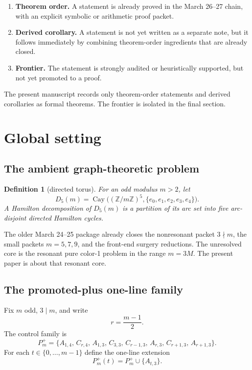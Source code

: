 \documentclass[11pt]{article}
\newtheorem{definition}[theorem]{Definition}
\newcommand{\Z}{\mathbb Z}
\newcommand{\1}{\mathbf 1}
\begin{document}
\begin{enumerate}[label=\textup{(\roman*)},leftmargin=2.8em]
\item \textbf{Theorem order.} A statement is already proved in the March 26--27 chain, with an explicit symbolic or arithmetic proof packet.
\item \textbf{Derived corollary.} A statement is not yet written as a separate note, but it follows immediately by combining theorem-order ingredients that are already closed.
\item \textbf{Frontier.} The statement is strongly audited or heuristically supported, but not yet promoted to a proof.
\end{enumerate}

The present manuscript records only theorem-order statements and derived corollaries as formal theorems.
The frontier is isolated in the final section.

\section{Global setting}

\subsection{The ambient graph-theoretic problem}

\begin{definition}[directed torus]
For an odd modulus \(m>2\), let
\[
D_5(m)=\operatorname{Cay}\big((\Z/m\Z)^5,\{e_0,e_1,e_2,e_3,e_4\}\big).
\]
A Hamilton decomposition of \(D_5(m)\) is a partition of its arc set into five arc-disjoint directed Hamilton cycles.
\end{definition}

The older March 24--25 package already closes the nonresonant packet \(3\nmid m\), the small packets \(m=5,7,9\), and the front-end surgery reductions.
The unresolved core is the resonant pure color-1 problem in the range \(m=3M\).
The present paper is about that resonant core.

\subsection{The promoted-plus one-line family}

Fix \(m\) odd, \(3\mid m\), and write
\[
r=\frac{m-1}{2}.
\]
The control family is
\[
P_m^+
=
\{
A_{1,4},\, C_{r,4},\, A_{1,3},\, C_{3,3},\, C_{r-1,3},\, A_{r,3},\, C_{r+1,3},\, A_{r+1,3}
\}.
\]
For each \(t\in\{0,\dots,m-1\}\) define the one-line extension
\[
P_m^+(t)=P_m^+\cup\{A_{t,3}\}.
\]
\end{document}
